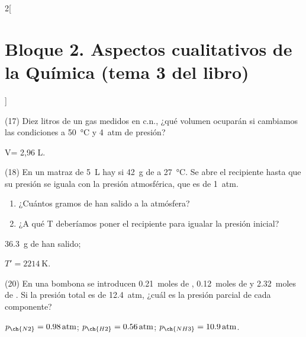 \documentclass[10pt]{article}
\begin{document}
\begin{multicols}{2}[
    \section{Bloque 2. Aspectos cualitativos de la Química (tema 3 del libro)}
  ]
\begin{exercise}[
    tags    = {},
    topics  = {química,química básica},
    source  = {FQ 1B MGH 2016, p84, e17},
  ]
  (17) Diez litros de un gas medidos en c.n., ¿qué volumen ocuparán
  si cambiamos las condiciones a \SI{50}{\celsius} y \SI{4}{atm} de presión?
\end{exercise}

\begin{solution}
  V= 2,96 L.
\end{solution}




\begin{exercise}[
    tags    = {},
    topics  = {química,química básica},
    source  = {FQ 1B MGH 2016, p84, e18},
  ]
  (18) En un matraz de \SI{5}{\liter} hay si \SI{42}{\gram} de  a \SI{27}{\celsius}. Se abre el recipiente
  hasta que su presión se iguala con la presión atmosférica,
  que es de \SI{1}{atm}.
  \begin{enumerate}
    \item ¿Cuántos gramos de  han salido a la atmósfera?
    \item ¿A qué T deberíamos poner el recipiente para igualar la presión inicial?
  \end{enumerate}
\end{exercise}

\begin{solution}
  \begin{enumerate*}
    \item \SI{36.3}{\gram} de  han salido;
    \item \( T' = \SI{2214}{\kelvin} \).
  \end{enumerate*}
\end{solution}




\begin{exercise}[
    tags    = {},
    topics  = {química,química básica},
    source  = {FQ 1B MGH 2016, p84, e20},
  ]
  (20) En una bombona se introducen \SI{0.21}{moles} de , \SI{0.12}{moles}
  de  y \SI{2.32}{moles} de . Si la presión total es de \SI{12.4}{atm}, ¿cuál es la presión parcial de cada componente?
\end{exercise}

\begin{solution}
  \( p_{\ch{N2}} = \SI{0.98}{atm} \); \( p_{\ch{H2}} = \SI{0.56}{atm} \); \( p_{\ch{NH3}} = \SI{10.9}{atm} \).
\end{solution}





\end{multicols}
\end{document}

